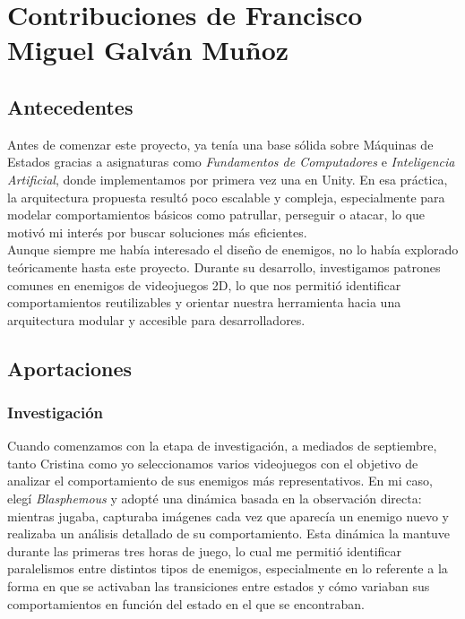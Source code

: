 \section{Contribuciones de Francisco Miguel Galván Muñoz}
\subsection{Antecedentes}
Antes de comenzar este proyecto, ya tenía una base sólida sobre Máquinas de Estados gracias a asignaturas como \textit{Fundamentos de Computadores} e \textit{Inteligencia Artificial}, donde implementamos por primera vez una en Unity. En esa práctica, la arquitectura propuesta resultó poco escalable y compleja, especialmente para modelar comportamientos básicos como patrullar, perseguir o atacar, lo que motivó mi interés por buscar soluciones más eficientes.\\

Aunque siempre me había interesado el diseño de enemigos, no lo había explorado teóricamente hasta este proyecto. Durante su desarrollo, investigamos patrones comunes en enemigos de videojuegos 2D, lo que nos permitió identificar comportamientos reutilizables y orientar nuestra herramienta hacia una arquitectura modular y accesible para desarrolladores.\\
 
\subsection{Aportaciones}
\subsubsection{Investigación}
Cuando comenzamos con la etapa de investigación, a mediados de septiembre, tanto Cristina como yo seleccionamos varios videojuegos con el objetivo de analizar el comportamiento de sus enemigos más representativos. En mi caso, elegí \textit{Blasphemous} y adopté una dinámica basada en la observación directa: mientras jugaba, capturaba imágenes cada vez que aparecía un enemigo nuevo y realizaba un análisis detallado de su comportamiento. Esta dinámica la mantuve durante las primeras tres horas de juego, lo cual me permitió identificar paralelismos entre distintos tipos de enemigos, especialmente en lo referente a la forma en que se activaban las transiciones entre estados y cómo variaban sus comportamientos en función del estado en el que se encontraban.\\

